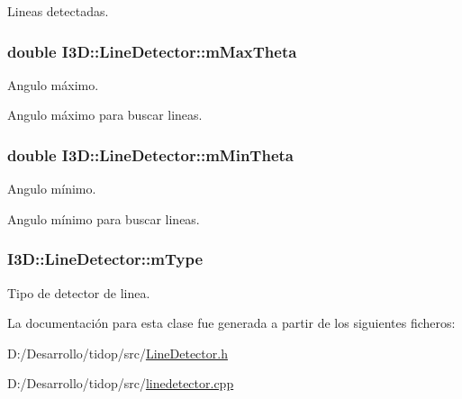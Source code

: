 Lineas detectadas. 

\subsubsection[{\texorpdfstring{m\+Max\+Theta}{mMaxTheta}}]{\setlength{\rightskip}{0pt plus 5cm}double I3\+D\+::\+Line\+Detector\+::m\+Max\+Theta\hspace{0.3cm}{\ttfamily [protected]}}\hypertarget{class_i3_d_1_1_line_detector_afbb629bc06fdc61296e03b93506e0c37}{}\label{class_i3_d_1_1_line_detector_afbb629bc06fdc61296e03b93506e0c37}


Angulo máximo. 

Angulo máximo para buscar lineas. 
\subsubsection[{\texorpdfstring{m\+Min\+Theta}{mMinTheta}}]{\setlength{\rightskip}{0pt plus 5cm}double I3\+D\+::\+Line\+Detector\+::m\+Min\+Theta\hspace{0.3cm}{\ttfamily [protected]}}\hypertarget{class_i3_d_1_1_line_detector_a3d359c9077a01c74308c4c05975a17d5}{}\label{class_i3_d_1_1_line_detector_a3d359c9077a01c74308c4c05975a17d5}


Angulo mínimo. 

Angulo mínimo para buscar lineas. 
\subsubsection[{\texorpdfstring{m\+Type}{mType}}]{ I3\+D\+::\+Line\+Detector\+::m\+Type\hspace{0.3cm}{\ttfamily [protected]}}\hypertarget{class_i3_d_1_1_line_detector_ae988a8bc160374b7314ccff2495deced}{}\label{class_i3_d_1_1_line_detector_ae988a8bc160374b7314ccff2495deced}


Tipo de detector de linea. 



La documentación para esta clase fue generada a partir de los siguientes ficheros\+:\begin{DoxyCompactItemize}
\item 
D\+:/\+Desarrollo/tidop/src/\hyperlink{_line_detector_8h}{Line\+Detector.\+h}\item 
D\+:/\+Desarrollo/tidop/src/\hyperlink{linedetector_8cpp}{linedetector.\+cpp}\end{DoxyCompactItemize}
